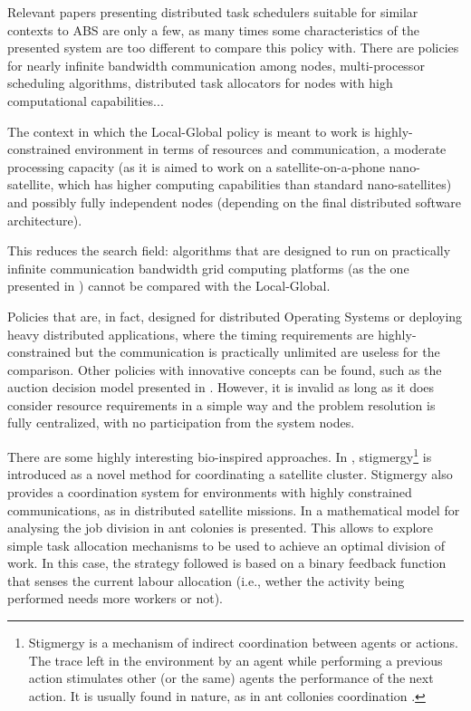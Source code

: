Relevant papers presenting distributed task schedulers suitable for similar contexts to ABS are only a few, as many times some characteristics of the presented system are too different to compare this policy with. There are policies for nearly infinite bandwidth communication among nodes, multi-processor scheduling algorithms, distributed task allocators for nodes with high computational capabilities...

The context in which the Local-Global policy is meant to work is highly-constrained environment in terms of resources and communication, a moderate processing capacity (as it is aimed to work on a satellite-on-a-phone nano-satellite, which has higher computing capabilities than standard nano-satellites) and possibly fully independent nodes (depending on the final distributed software architecture).

This reduces the search field: algorithms that are designed to run on practically infinite communication bandwidth grid computing platforms (as the one presented in \cite{servers}) cannot be compared with the Local-Global.

Policies that are, in fact, designed for distributed Operating Systems or deploying heavy distributed applications, where the timing requirements are highly-constrained but the communication is practically unlimited \citep{anderson2007consensus,pilloni2012decentralized} are useless for the comparison. Other policies with innovative concepts can be found, such as the auction decision model presented in \cite{luo2013distributed}. However, it is invalid as long as it does consider resource requirements in a simple way and the problem resolution is fully centralized, with no participation from the system nodes.

There are some highly interesting bio-inspired approaches. In \cite{Stigmergy}, stigmergy\footnote{Stigmergy is a mechanism of indirect coordination between agents or actions. The trace left in the environment by an agent while performing a previous action stimulates other (or the same) agents the performance of the next action. It is usually found in nature, as in ant collonies coordination \cite{marsh2008stigmergic}.} is introduced as a novel method for coordinating a satellite cluster. Stigmergy also provides a coordination system for environments with highly constrained communications, as in distributed satellite missions. In \cite{antcollonies} a mathematical model for analysing the job division in ant colonies is presented. This allows to explore simple task allocation mechanisms to be used to achieve an optimal division of work. In this case, the strategy followed is based on a binary feedback function that senses the current labour allocation (i.e., wether the activity being performed needs more workers or not).

